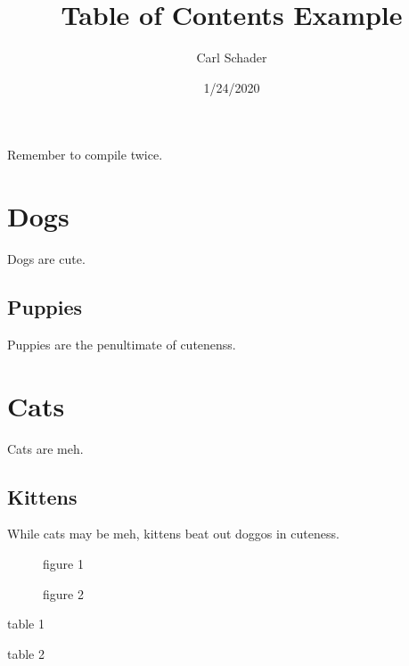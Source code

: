 \documentclass{article}
\title{Table of Contents Example}
\date{1/24/2020}
\author{Carl Schader}
\begin{document}
	\maketitle
	Remember to compile twice.
	\doublespacing
	\tableofcontents %

	\newpage
	\singlespacing
	\section{Dogs}
	Dogs are cute.
	\subsection{Puppies}
	Puppies are the penultimate of cutenenss.

	\newpage
	\section{Cats}
	Cats are meh.
	\subsection{Kittens}
	While cats may be meh, kittens beat out doggos in cuteness.

	\begin{figure}[h!]
		\caption{figure 1}
	\end{figure}
	\begin{figure}[h!]
		\caption{figure 2}
	\end{figure}

	\begin{table}[h!]
		\caption{table 1}
	\end{table}

	\begin{table}[h!]
		\caption{table 2}
	\end{table}

	\newpage %
	\begin{appendix}
		\listoffigures
		\listoftables
	\end{appendix}
\end{document}
